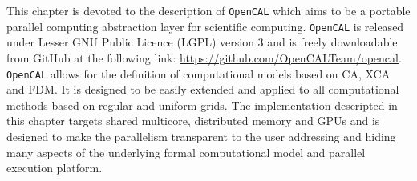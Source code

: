 This chapter is devoted to the description of \texttt{OpenCAL} which aims to be a portable parallel computing abstraction layer for scientific computing. \texttt{OpenCAL} is released under Lesser GNU Public Licence (LGPL) version 3 and is freely downloadable from GitHub at the following link: \url{https://github.com/OpenCALTeam/opencal}. \texttt{OpenCAL} allows for  the definition of computational models based on CA, XCA and FDM. It is designed to be easily extended and applied to all computational methods based on regular and uniform grids. 
The implementation descripted in this chapter targets shared multicore, distributed memory and GPUs and is designed to make the parallelism transparent to the user addressing and hiding many aspects of the underlying formal computational model and parallel execution platform. 

